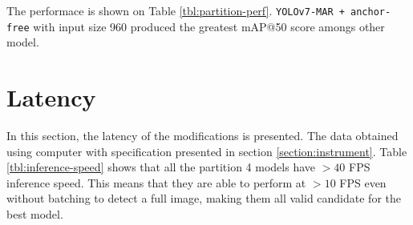 The performace is shown on Table \ref{tbl:partition-perf}.
\verb|YOLOv7-MAR + anchor-free| with input size 960 produced the greatest mAP@50 score
amongs other model.


\begin{table}
  \centering
  \label{tbl:partition-perf}
  \vspace{-1ex}
  
\end{table}

\section{Latency}
In this section, the latency of the modifications is presented.
The data obtained using computer with specification presented in section \ref{section:instrument}.
Table \ref{tbl:inference-speed} shows that all the partition 4 models have $> 40$ FPS inference speed.
This means that they are able to perform at $>10$ FPS even without batching to detect a full image, making them all valid candidate for the best model.


\begin{table}
  \centering
  \label{tbl:inference-speed}
  \vspace{-1ex}
  \begin{adjustbox}{width=\textwidth}
  
  \end{adjustbox}

\end{table}

